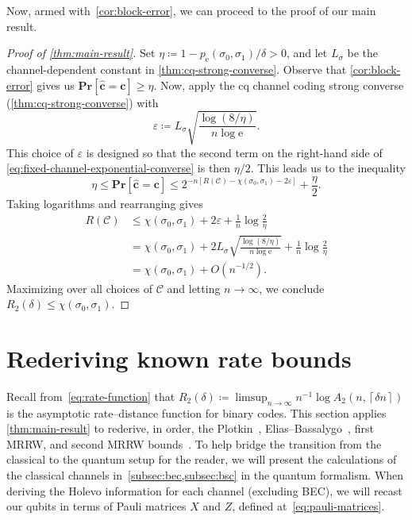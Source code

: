 \documentclass[11pt]{article}
\renewcommand{\leq}{\leqslant}
\renewcommand{\geq}{\geqslant}
\theoremstyle{remark}
\newcommand{\cC}{\mathcal{C}}
\newcommand{\Prb}{\mathbf{Pr}}
\newcommand{\bchat}{\hat{\mathbf{c}}}
\newcommand{\bc}{\mathbf{c}}
\newcommand{\eps}{\varepsilon}
\newcommand{\ceil}[1]{\left\lceil #1 \right\rceil}
\begin{document}
Now, armed with~\cref{cor:block-error}, we can proceed to the proof of our main result.

\begin{proof}[Proof of \cref{thm:main-result}]
Set $\eta \coloneqq 1-p_{\mathrm{e}}(\sigma_0,\sigma_1)/\delta > 0$, and let $L_\sigma$ be the channel-dependent constant in \cref{thm:cq-strong-converse}. Observe that \cref{cor:block-error} gives us $\Prb[\bchat = \bc] \geq \eta$. Now, apply the cq channel coding strong converse (\cref{thm:cq-strong-converse}) with
\begin{equation*}
\eps \coloneqq L_\sigma\sqrt{\frac{\log(8/\eta)}{n\log{\mathrm{e}}}}.
\end{equation*}
This choice of $\eps$ is designed so that the second term on the right-hand side of \eqref{eq:fixed-channel-exponential-converse} is then $\eta/2$. This leads us to the inequality
\begin{equation*}
\eta \leq \Prb[\bchat = \bc] \leq 2^{-n[R(\cC)-\chi(\sigma_0,\sigma_1)-2\eps]} + \frac{\eta}{2}.
\end{equation*}
Taking logarithms and rearranging gives
\begin{align*}
R(\cC) &\leq \chi(\sigma_0,\sigma_1) + 2\eps + \frac{1}{n}\log{\frac{2}{\eta}} \\
&= \chi(\sigma_0,\sigma_1) + 2L_\sigma\sqrt{\frac{\log(8/\eta)}{n\log{\mathrm{e}}}} + \frac{1}{n}\log{\frac{2}{\eta}} \\
&= \chi(\sigma_0,\sigma_1) + O(n^{-1/2}).
\end{align*}
Maximizing over all choices of $\cC$ and letting $n \to \infty$, we conclude $R_2(\delta) \leq \chi(\sigma_0,\sigma_1)$.
\end{proof}

\section{Rederiving known rate bounds}
\label{sec:known-rate-bounds}

Recall from~\eqref{eq:rate-function} that $R_2(\delta) \coloneqq \limsup_{n \to \infty} n^{-1}\log{A_2(n,\ceil{\delta n})}$ is the asymptotic rate--distance function for binary codes. This section applies \cref{thm:main-result} to rederive, in order, the Plotkin~\cite{Plo60}, Elias--Bassalygo~\cite{Eli55,Bas65}, first MRRW, and second MRRW bounds~\cite{MRRW77}. To help bridge the transition from the classical to the quantum setup for the reader, we will present the calculations of the classical channels in~\cref{subsec:bec,subsec:bsc} in the quantum formalism. When deriving the Holevo information for each channel (excluding BEC), we will recast our qubits in terms of Pauli matrices $X$ and $Z$, defined at~\eqref{eq:pauli-matrices}.
\end{document}
